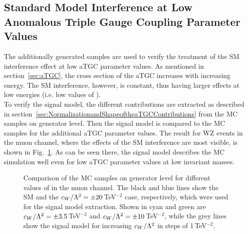 \subsection{Standard Model Interference at Low Anomalous Triple Gauge Coupling Parameter Values}
The additionally generated samples are used to verify the treatment of the SM interference effect at low aTGC parameter values. As mentioned in section~\ref{sec:aTGC}, the cross section of the aTGC increases with increasing energy. The SM interference, however, is constant, thus having larger effects at low energies (i.e. low values of \MWV).\\

\noindent To verify the signal model, the different contributions are extracted as described in section~\ref{sec:NormalizationandShapeoftheaTGCContributions} from the MC samples on generator level. Then the signal model is compared to the MC samples for the additional aTGC parameter values. The result for WZ events in the muon channel, where the effects of the SM interference are most visible, is shown in Fig.~\ref{fig:signal:smintverif_WZ_mu}. As can be seen there, the signal model describes the MC simulation well even for low aTGC parameter values at low invariant masses.


\begin{figure}[bh!]
	\centering
	\caption[Comparison of the MC samples on generator level for different values of \Tccw \ in the muon channel]{Comparison of the MC samples on generator level for different values of \Tccw in the muon channel. The black and blue lines show the SM and the $c_{W}/\Lambda^2 = \pm 20$\,TeV$^{-2}$ case, respectively, which were used for the signal model extraction. Shown in cyan and green are $c_{W}/\Lambda^2 = \pm 3.5$\,TeV$^{-2}$ and $c_{W}/\Lambda^2 = \pm 10$\,TeV$^{-2}$, while the grey lines show the signal model for increasing $c_{W}/\Lambda^2$ in steps of 1\,TeV$^{-2}$.}
	\label{fig:signal:smintverif_WZ_mu}
\end{figure}
